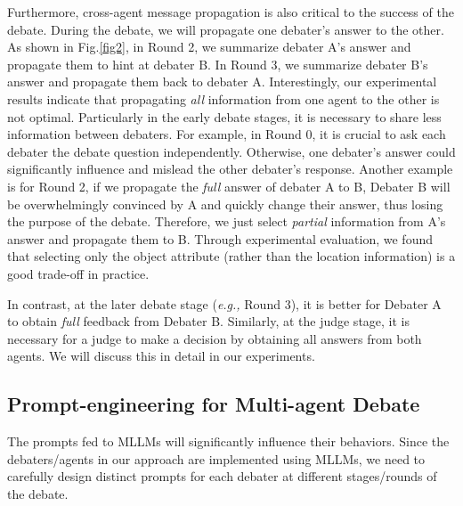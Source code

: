 \documentclass[10pt,twocolumn,letterpaper]{article}
\begin{document}
Furthermore, cross-agent message propagation is also critical to the success of the debate. During the debate, we will propagate one debater's answer to the other. As shown in Fig.\ref{fig2}, in Round 2, we summarize debater A's answer and propagate them to hint at debater B. In Round 3, we summarize debater B's answer and propagate them back to debater A. 
Interestingly, our experimental results indicate that propagating \emph{all} information from one agent to the other is not optimal. Particularly in the early debate stages, it is necessary to share less information between debaters. For example, in Round 0, it is crucial to ask each debater the debate question independently. Otherwise, one debater's answer could significantly influence and mislead the other debater's response. Another example is for Round 2, if we propagate the \emph{full} answer of debater A to B, Debater B will be overwhelmingly convinced by A and quickly change their answer, thus losing the purpose of the debate. Therefore, we just select \emph{partial} information from A's answer and propagate them to B. Through experimental evaluation, we found that selecting only the object attribute (rather than the location information) is a good trade-off in practice. 

In contrast, at the later debate stage (\emph{e.g.,} Round 3), it is better for Debater A to obtain \emph{full} feedback from Debater B. Similarly, at the judge stage, it is necessary for a judge to make a decision by obtaining all answers from both agents. We will discuss this in detail in our experiments.




\subsection{Prompt-engineering for Multi-agent Debate}
The prompts fed to MLLMs will significantly influence their behaviors. Since the debaters/agents in our approach are implemented using MLLMs, we need to carefully design distinct prompts for each debater at different stages/rounds of the debate.
\end{document}
